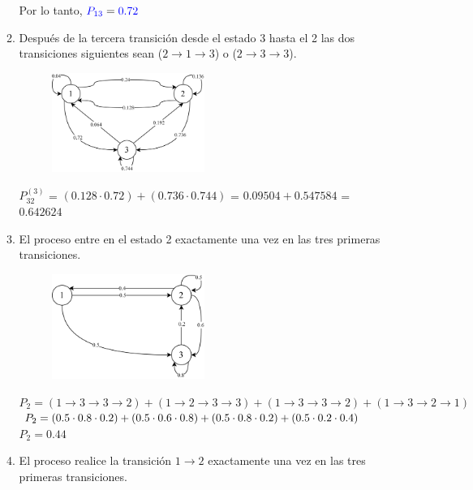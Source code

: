 \documentclass{templateNote}
\begin{document}
\begin{enumerate}[start = 2]
\begin{enumerate}[label=\alph*)]
        Por lo tanto, $\textcolor{blue}{P_{13}} = \textcolor{blue}{0.72}$

        \item Después de la tercera transición desde el estado 3 hasta el 2 las dos transiciones siguientes sean ($2\rightarrow1\rightarrow3$) o ($2\rightarrow3\rightarrow3$).
        
        \begin{figure}[H]
            \centering
            \includegraphics[width=0.5\textwidth]{img/ejer4_2.png}
        \end{figure}

        $P_{32}^{(3)}$ = $(0.128\cdot0.72) + (0.736\cdot0.744)$ = $0.09504 + 0.547584$ = $0.642624$
        
        \item El proceso entre en el estado 2 exactamente una vez en las tres primeras transiciones.
        \begin{figure}[H]
            \centering
            \includegraphics[width=0.5\textwidth]{img/ejer42_2.png}
        \end{figure}

        $P_{2} = (1 \rightarrow 3 \rightarrow 3 \rightarrow 2) + (1 \rightarrow 2 \rightarrow 3 \rightarrow 3) + (1 \rightarrow 3 \rightarrow 3 \rightarrow 2) + (1 \rightarrow 3 \rightarrow 2 \rightarrow 1) $ \\
        $P_{2} = (0.5 \cdot 0.8 \cdot 0.2) + (0.5 \cdot 0.6 \cdot 0.8) + (0.5 \cdot 0.8 \cdot 0.2) + (0.5 \cdot 0.2 \cdot 0.4) \\$
        $P_{2} = 0.44$

        \item El proceso realice la transición $1\rightarrow2$ exactamente una vez en las tres primeras
        transiciones.


\end{enumerate}
\end{enumerate}
\end{document}
